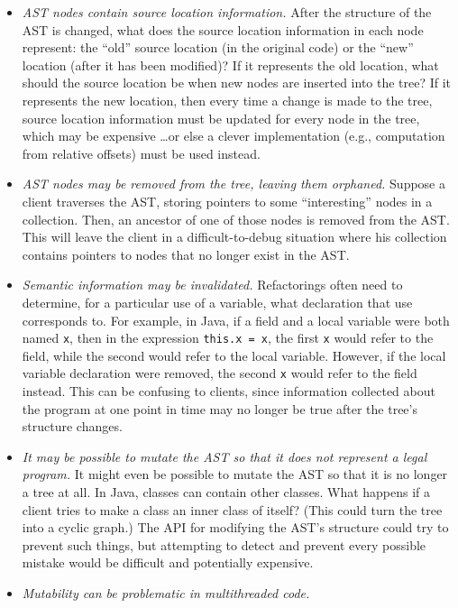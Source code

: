 \documentclass[prodmode]{acmlarge}
\newcommand{\ttt}[1]{\texttt{#1}}
\begin{document}
\begin{itemize}
\item \textit{AST nodes contain source location information.}  After the
structure of the AST is changed, what does the source location information in
each node represent: the ``old'' source location (in the original code) or the
``new'' location (after it has been modified)?  If it represents the old
location, what should the source location be when new nodes are inserted into
the tree?  If it represents the new location, then every time a change is made
to the tree, source location information must be updated for every node in the
tree, which may be expensive \dots or else a clever implementation (e.g.,
computation from relative offsets) must be used instead.
\item \textit{AST nodes may be removed from the tree, leaving them orphaned.}
Suppose a client traverses the AST, storing pointers to some ``interesting''
nodes in a collection.  Then, an ancestor of one of those nodes is removed from
the AST.  This will leave the client in a difficult-to-debug situation where
his collection contains pointers to nodes that no longer exist in the AST.
\item \textit{Semantic information may be invalidated.}  Refactorings often
need to determine, for a particular use of a variable, what declaration that
use corresponds to.  For example, in Java, if a field and a local variable were
both named \ttt{x}, then in the expression \ttt{this.x = x}, the first \ttt{x}
would refer to the field, while the second would refer to the local variable.
However, if the local variable declaration were removed, the second \ttt{x}
would refer to the field instead.  This can be confusing to clients, since
information collected about the program at one point in time may no longer be
true after the tree's structure changes.
\item \textit{It may be possible to mutate the AST so that it does not
represent a legal program.}  It might even be possible to mutate the AST so
that it is no longer a tree at all.  In Java, classes can contain other
classes.  What happens if a client tries to make a class an inner class of
itself?  (This could turn the tree into a cyclic graph.)  The API for modifying
the AST's structure could try to prevent such things, but attempting to detect
and prevent every possible mistake would be difficult and potentially
expensive.
\item \textit{Mutability can be problematic in multithreaded code.}
\end{itemize}
\end{document}
